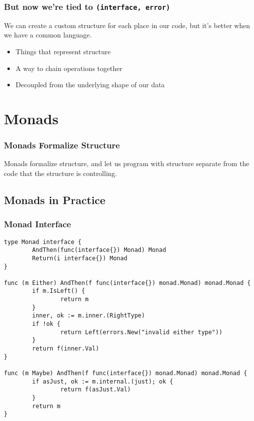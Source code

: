 \documentclass{beamer}
\begin{document}
\begin{frame}[fragile]
  \frametitle{But now we're tied to {\tt (interface{}, error)}}

  We can create a custom structure for each place in our code, but
  it's better when we have a common language.

  \begin{itemize}
  \item Things that represent structure
  \item A way to chain operations together
  \item Decoupled from the underlying shape of our data
  \end{itemize}
\end{frame}

\section{Monads}

\begin{frame}
  \frametitle{Monads Formalize Structure}

  Monads formalize structure, and let us program with structure
  separate from the code that the structure is controlling.
\end{frame}

\subsection{Monads in Practice}

\begin{frame}[fragile]
  \frametitle{Monad Interface}
\begin{lstlisting}
type Monad interface {
        AndThen(func(interface{}) Monad) Monad
        Return(i interface{}) Monad
}

func (m Either) AndThen(f func(interface{}) monad.Monad) monad.Monad {
        if m.IsLeft() {
                return m
        }
        inner, ok := m.inner.(RightType)
        if !ok {
                return Left(errors.New("invalid either type"))
        }
        return f(inner.Val)
}

func (m Maybe) AndThen(f func(interface{}) monad.Monad) monad.Monad {
        if asJust, ok := m.internal.(just); ok {
                return f(asJust.Val)
        }
        return m
}
\end{lstlisting}
\end{frame}
\end{document}
